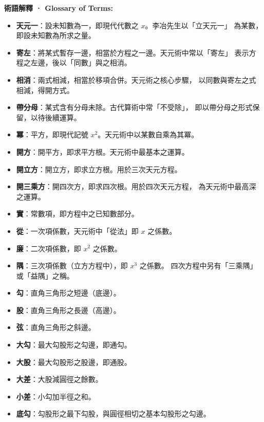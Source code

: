 \documentclass[9pt,a4paper]{article}
\begin{document}
\noindent\begin{minipage}[t]{0.48\textwidth}
\noindent\textbf{術語解釋 · Glossary of Terms:}

\begin{itemize}[leftmargin=1em,itemsep=2pt,topsep=2pt]
  \item \textbf{天元一}：設未知數為一，即現代代數之 $x$。李冶先生以「立天元一」
  為某數，即設未知數為所求之量。
  \item \textbf{寄左}：將某式暫存一邊，相當於方程之一邊。天元術中常以「寄左」
  表示方程之左邊，後以「同數」與之相消。
  \item \textbf{相消}：兩式相減，相當於移項合併。天元術之核心步驟，
  以同數與寄左之式相減，得開方式。
  \item \textbf{帶分母}：某式含有分母未除。古代算術中常「不受除」，
  即以帶分母之形式保留，以待後續運算。
  \item \textbf{冪}：平方，即現代記號 $x^2$。天元術中以某數自乘為其冪。
  \item \textbf{開方}：開平方，即求平方根。天元術中最基本之運算。
  \item \textbf{開立方}：開立方，即求立方根。用於三次天元方程。
  \item \textbf{開三乘方}：開四次方，即求四次根。用於四次天元方程，
  為天元術中最高深之運算。
  \item \textbf{實}：常數項，即方程中之已知數部分。
  \item \textbf{從}：一次項係數，天元術中「從法」即 $x$ 之係數。
  \item \textbf{廉}：二次項係數，即 $x^2$ 之係數。
  \item \textbf{隅}：三次項係數（立方方程中），即 $x^3$ 之係數。
  四次方程中另有「三乘隅」或「益隅」之稱。
  \item \textbf{勾}：直角三角形之短邊（底邊）。
  \item \textbf{股}：直角三角形之長邊（高邊）。
  \item \textbf{弦}：直角三角形之斜邊。
  \item \textbf{大勾}：最大勾股形之勾邊，即通勾。
  \item \textbf{大股}：最大勾股形之股邊，即通股。
  \item \textbf{大差}：大股減圓徑之餘數。
  \item \textbf{小差}：小勾加半徑之和。
  \item \textbf{底勾}：勾股形之最下勾股，與圓徑相切之基本勾股形之勾邊。
\end{itemize}
\end{minipage}%
\hfill%
\end{document}
